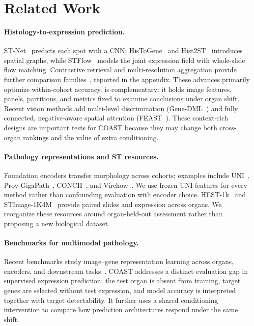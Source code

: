 \section{Related Work}
\label{sec:related}
\paragraph{Histology-to-expression prediction.}
ST-Net~\cite{stnet} predicts each spot with a CNN; HisToGene~\cite{histogene} and
Hist2ST~\cite{hist2st} introduces spatial graphs, while STFlow~\cite{stflow} models the joint
expression field with whole-slide flow matching. Contrastive retrieval and multi-resolution
aggregation provide further comparison families~\cite{bleep,triplex}, reported in the appendix.
These advances primarily optimize within-cohort accuracy. \coast{} is complementary: it holds image
features, panels, partitions, and metrics fixed to examine conclusions under organ shift. Recent
vision methods add multi-level discrimination (Gene-DML~\cite{genedml}) and fully connected,
negative-aware spatial attention (FEAST~\cite{feast}). These context-rich designs are important tests
for COAST because they may change both cross-organ rankings and the value of extra conditioning.

\paragraph{Pathology representations and ST resources.}
Foundation encoders transfer morphology across cohorts; examples include UNI~\cite{uni},
Prov-GigaPath~\cite{gigapath}, CONCH~\cite{conch}, and Virchow~\cite{virchow}. We use frozen UNI
features for every method rather than confounding evaluation with encoder choice. HEST-1k~\cite{hest}
and STImage-1K4M~\cite{stimage} provide paired slides and expression across organs. We reorganize
these resources around organ-held-out assessment rather than proposing a new biological dataset.

\paragraph{Benchmarks for multimodal pathology.}
Recent benchmarks study image--gene representation learning across organs, encoders, and downstream
tasks~\cite{hescape}. COAST addresses a distinct evaluation gap in supervised expression prediction:
the test organ is absent from training, target genes are selected without test expression, and model
accuracy is interpreted together with target detectability. It further uses a shared conditioning
intervention to compare how prediction architectures respond under the same shift.

